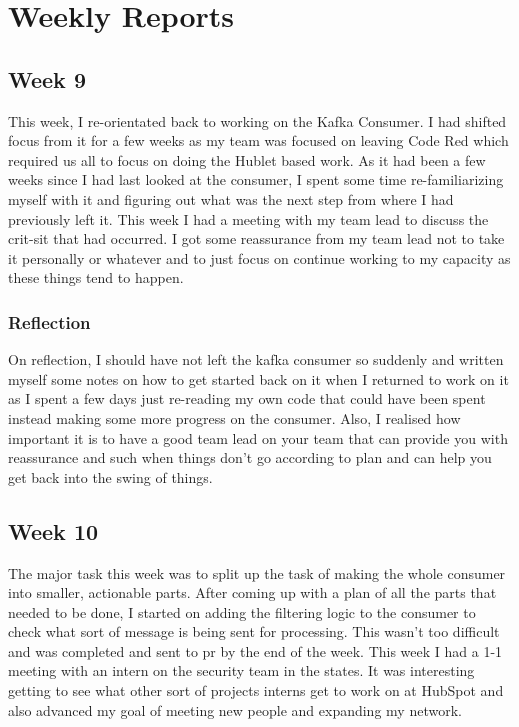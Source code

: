 \chapter{Weekly Reports}

\section{Week 9}
This week, I re-orientated back to working on the Kafka Consumer. I had shifted focus from it for a few weeks as my team was focused on leaving Code Red which required us all to focus on doing the Hublet based work. As it had been a few weeks since I had last looked at the consumer, I spent some time re-familiarizing myself with it and figuring out what was the next step from where I had previously left it. \newline This week I had a meeting with my team lead to discuss the crit-sit that had occurred. I got some reassurance from my team lead not to take it personally or whatever and to just focus on continue working to my capacity as these things tend to happen. 

\subsection{Reflection}
On reflection, I should have not left the kafka consumer so suddenly and written myself some notes on how to get started back on it when I returned to work on it as I spent a few days just re-reading my own code that could have been spent instead making some more progress on the consumer. Also, I realised how important it is to have a good team lead on your team that can provide you with reassurance and such when things don't go according to plan and can help you get back into the swing of things.
\section{Week 10}
The major task this week was to split up the task of making the whole consumer into smaller, actionable parts. After coming up with a plan of all the parts that needed to be done, I started on adding the filtering logic to the consumer to check what sort of message is being sent for processing. This wasn't too difficult and was completed and sent to pr by the end of the week. \newline This week I had a 1-1 meeting with an intern on the security team in the states. It was interesting getting to see what other sort of projects interns get to work on at HubSpot and also advanced my goal of meeting new people and expanding my network.

